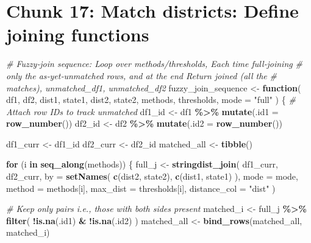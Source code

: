 \documentclass[
]{article}
\newenvironment{Shaded}{\begin{snugshade}}{\end{snugshade}}
\newcommand{\AttributeTok}[1]{\textcolor[rgb]{0.13,0.29,0.53}{#1}}
\newcommand{\CommentTok}[1]{\textcolor[rgb]{0.56,0.35,0.01}{\textit{#1}}}
\newcommand{\ControlFlowTok}[1]{\textcolor[rgb]{0.13,0.29,0.53}{\textbf{#1}}}
\newcommand{\FunctionTok}[1]{\textcolor[rgb]{0.13,0.29,0.53}{\textbf{#1}}}
\newcommand{\NormalTok}[1]{#1}
\newcommand{\OtherTok}[1]{\textcolor[rgb]{0.56,0.35,0.01}{#1}}
\newcommand{\SpecialCharTok}[1]{\textcolor[rgb]{0.81,0.36,0.00}{\textbf{#1}}}
\newcommand{\StringTok}[1]{\textcolor[rgb]{0.31,0.60,0.02}{#1}}
\begin{document}
\section*{Chunk 17: Match districts: Define joining functions}\label{chunk-17-match-districts-define-joining-functions}

\begin{Shaded}
\begin{Highlighting}[]
\CommentTok{\# Fuzzy‑join sequence: Loop over methods/thresholds, Each time full‑joining}
\CommentTok{\# only the as‑yet‑unmatched rows, and at the end Return joined (all the}
\CommentTok{\# matches), unmatched\_df1, unmatched\_df2}
\NormalTok{fuzzy\_join\_sequence }\OtherTok{\textless{}{-}} \ControlFlowTok{function}\NormalTok{(}
\NormalTok{    df1, df2, dist1, state1, dist2, state2, methods, thresholds,}
    \AttributeTok{mode =} \StringTok{"full"}
\NormalTok{) \{}
    \CommentTok{\# Attach row IDs to track unmatched}
\NormalTok{    df1\_id }\OtherTok{\textless{}{-}}\NormalTok{ df1 }\SpecialCharTok{\%\textgreater{}\%}
        \FunctionTok{mutate}\NormalTok{(}\AttributeTok{.id1 =} \FunctionTok{row\_number}\NormalTok{())}
\NormalTok{    df2\_id }\OtherTok{\textless{}{-}}\NormalTok{ df2 }\SpecialCharTok{\%\textgreater{}\%}
        \FunctionTok{mutate}\NormalTok{(}\AttributeTok{.id2 =} \FunctionTok{row\_number}\NormalTok{())}

\NormalTok{    df1\_curr }\OtherTok{\textless{}{-}}\NormalTok{ df1\_id}
\NormalTok{    df2\_curr }\OtherTok{\textless{}{-}}\NormalTok{ df2\_id}
\NormalTok{    matched\_all }\OtherTok{\textless{}{-}} \FunctionTok{tibble}\NormalTok{()}

    \ControlFlowTok{for}\NormalTok{ (i }\ControlFlowTok{in} \FunctionTok{seq\_along}\NormalTok{(methods)) \{}
\NormalTok{        full\_j }\OtherTok{\textless{}{-}} \FunctionTok{stringdist\_join}\NormalTok{(}
\NormalTok{            df1\_curr, df2\_curr, }\AttributeTok{by =} \FunctionTok{setNames}\NormalTok{(}
                \FunctionTok{c}\NormalTok{(dist2, state2),}
                \FunctionTok{c}\NormalTok{(dist1, state1)}
\NormalTok{            ),}
            \AttributeTok{mode =}\NormalTok{ mode, }\AttributeTok{method =}\NormalTok{ methods[i], }\AttributeTok{max\_dist =}\NormalTok{ thresholds[i],}
            \AttributeTok{distance\_col =} \StringTok{"dist"}
\NormalTok{        )}

        \CommentTok{\# Keep only pairs i.e., those with both sides present}
\NormalTok{        matched\_i }\OtherTok{\textless{}{-}}\NormalTok{ full\_j }\SpecialCharTok{\%\textgreater{}\%}
            \FunctionTok{filter}\NormalTok{(}
                \SpecialCharTok{!}\FunctionTok{is.na}\NormalTok{(.id1) }\SpecialCharTok{\&}
                  \SpecialCharTok{!}\FunctionTok{is.na}\NormalTok{(.id2)}
\NormalTok{            )}
\NormalTok{        matched\_all }\OtherTok{\textless{}{-}} \FunctionTok{bind\_rows}\NormalTok{(matched\_all, matched\_i)}


\end{Highlighting}
\end{Shaded}
\end{document}
